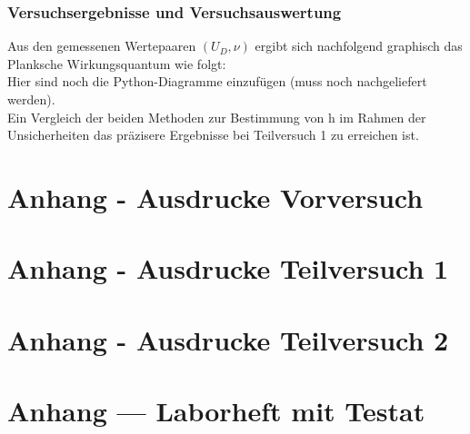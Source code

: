 \documentclass[12pt,oneside,oldfontcommands]{memoir}
\begin{document}
\subsubsection{Versuchsergebnisse und Versuchsauswertung}
Aus den gemessenen Wertepaaren $(U_D, \nu)$ ergibt sich nachfolgend graphisch das Planksche Wirkungsquantum wie folgt:\\

Hier sind noch die Python-Diagramme einzufügen (muss noch nachgeliefert werden).\\

Ein Vergleich der beiden Methoden zur Bestimmung von h im Rahmen der Unsicherheiten das präzisere Ergebnisse bei Teilversuch 1 zu erreichen ist.

\section{Anhang - Ausdrucke Vorversuch}


\section{Anhang - Ausdrucke Teilversuch 1}


\section{Anhang - Ausdrucke Teilversuch 2}



\section{Anhang --- Laborheft mit Testat}

\end{document}
